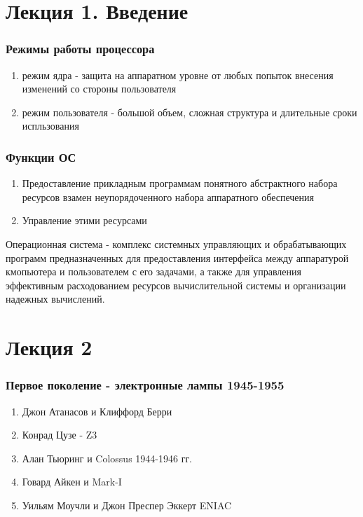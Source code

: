 \documentclass[a4paper]{article}
\begin{document}
    
\section{Лекция 1. Введение}

\subsubsection{Режимы работы процессора}
\begin{enumerate}
\item режим ядра - защита на аппаратном уровне от любых попыток внесения изменений со стороны пользователя
\item режим пользователя - большой объем, сложная структура и длительные сроки испльзования
\end{enumerate}

\subsubsection{Функции ОС}
\begin{enumerate}
\item Предоставление прикладным программам понятного абстрактного набора ресурсов взамен неупорядоченного набора аппаратного обеспечения
\item Управление этими ресурсами
\end{enumerate}

Операционная система - комплекс системных управляющих и обрабатывающих программ предназначенных для предоставления интерфейса между аппаратурой кмопьютера и пользователем с его задачами, а также для управления эффективным расходованием ресурсов вычислительной системы и организации надежных вычислений.

\section{Лекция 2}

\subsubsection{Первое поколение - электронные лампы 1945-1955}
\begin{enumerate}
\item Джон Атанасов и Клиффорд Берри
\item Конрад Цузе - Z3
\item Алан Тьюринг и Colossus 1944-1946 гг.
\item Говард Айкен и Mark-I
\item Уильям Моучли и Джон Преспер Эккерт ENIAC
\end{enumerate}
\end{document}
